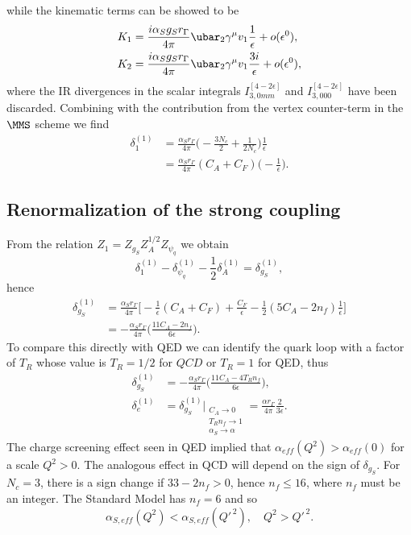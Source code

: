 while the kinematic terms can be showed to be 
\begin{align}
    K_1 &= \frac{i\alpha_Sg_Sr_\Gamma}{4\pi}\ubar_2\gamma^\mu v_1\frac{1}{\epsilon} + o(\epsilon^0), \\
    K_2 &= \frac{i\alpha_Sg_Sr_\Gamma}{4\pi}\ubar_2\gamma^\mu v_1\frac{3i}{\epsilon} + o(\epsilon^0), 
\end{align}
where the IR divergences in the scalar integrals  $I_{3,0mm}^{[4 - 2\epsilon]}$ and $I_{3,000}^{[4 - 2\epsilon]}$ have been discarded. Combining with the contribution from the vertex counter-term in the $\MMS$ scheme we find
\begin{equation}
    \begin{split}
        \delta_1^{(1)} &= \frac{\alpha_Sr_\Gamma}{4\pi}\bigg(-\frac{3N_c}{2} + \frac{1}{2N_c}\bigg)\frac{1}{\epsilon} \\
        &= \frac{\alpha_Sr_\Gamma}{4\pi}(C_A + C_F)\bigg(-\frac{1}{\epsilon}\bigg).
    \end{split}
\end{equation}

\subsection{Renormalization of the strong coupling}
From the relation $Z_1 = Z_{g_S}Z_A^{1/2}Z_{\psi_q}$ we obtain 
\begin{equation}
    \delta_1^{(1)} - \delta_{\psi_q}^{(1)} - \frac{1}{2}\delta_A^{(1)} = \delta_{g_S}^{(1)},
\end{equation}
hence
\begin{equation}
    \begin{split}
        \delta_{g_S}^{(1)} &= \frac{\alpha_Sr_\Gamma}{4\pi}\bigg[-\frac{1}{\epsilon}(C_A + C_F) + \frac{C_F}{\epsilon} - \frac{1}{2}(5C_A - 2n_f)\frac{1}{\epsilon}\bigg] \\
        &= -\frac{\alpha_Sr_\Gamma}{4\pi}\bigg(\frac{11C_A - 2n_f}{6\epsilon}\bigg).
    \end{split}
\end{equation}
To compare this directly with QED we can identify the quark loop with a factor of $T_R$ whose value is $T_R = 1/2$ for $QCD$ or $T_R = 1$ for QED, thus
\begin{align}
    \delta^{(1)}_{g_S} &= -\frac{\alpha_Sr_\Gamma}{4\pi}\bigg(\frac{11C_A - 4T_Rn_f}{6\epsilon}\bigg), \\
    \delta^{(1)}_e &= \delta^{(1)}_{g_S}|_{\substack{C_A \to 0 \\T_Rn_f \to 1 \\ \alpha_S \to \alpha}} = \frac{\alpha r_\Gamma}{4\pi}\frac{2}{3\epsilon}.
\end{align}
The charge screening effect seen in QED implied that $\alpha_{eff}(Q^2) > \alpha_{eff}(0)$ for a scale $Q^2 > 0$. The analogous effect in QCD will depend on the sign of $\delta_{g_S}$. For $N_c = 3$, there is a sign change if $33 - 2n_f > 0$, hence $n_f \le 16$, where $n_f$ must be an integer. The Standard Model has $n_f = 6$ and so
\begin{equation}
    \alpha_{S,eff}(Q^2) < \alpha_{S,eff}(Q'^{\,2}),\quad Q^2 > Q'^{\,2}.
\end{equation}




